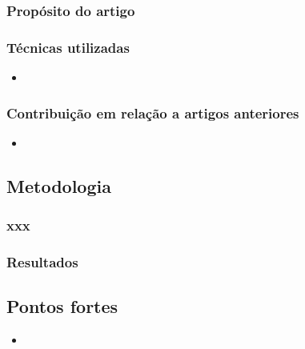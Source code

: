 \subsubsection{Propósito do artigo}

\subsubsection{Técnicas utilizadas} 
\begin{itemize}
  \item 
\end{itemize}  

\subsubsection{Contribuição em relação a artigos anteriores} %
 \begin{itemize}
   \item 
 \end{itemize}  

\subsection{Metodologia}

\subsubsection{xxx}

\subsubsection{Resultados}

\subsection{Pontos fortes} %
\begin{itemize}
  \item
\end{itemize}  

